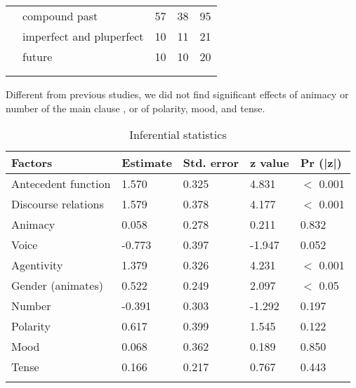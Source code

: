 \documentclass[output=paper,colorlinks,citecolor=brown]{langscibook}
\begin{document}
\begin{table}
{\begin{tabularx}{1.0\textwidth}{XXXXX}
  & compound past & 57 & 38 & 95  \\ %
  & imperfect and pluperfect & 10 & 11 & 21 \\ %
  & future & 10 & 10 & 20 \\  %
 \\      \lspbottomrule
\end{tabularx}
}
\end{table}


Different from previous studies, we did not find significant effects of animacy or number of the main clause , or of polarity, mood, and tense.

\begin{table}
\caption{Inferential statistics}
\label{tab:myname:results_fact:Istrate}
\begin{tabularx}{1.0\textwidth}{XXXXX}
 \lsptoprule
Factors & Estimate & Std. error & z value & Pr (|z|)\\
  \midrule
Antecedent function & 1.570 & 0.325 & 4.831 & $<$ 0.001\\ %
Discourse relations & 1.579 & 0.378 & 4.177 & $<$ 0.001 \\ %
Animacy & 0.058 & 0.278 & 0.211 & 0.832 \\ %
Voice & -0.773 & 0.397 & -1.947 & 0.052 \\ %
Agentivity & 1.379 & 0.326 & 4.231 & $<$ 0.001 \\ %
Gender (animates) & 0.522 & 0.249 & 2.097 & $<$ 0.05 \\ %
Number & -0.391 & 0.303 & -1.292 & 0.197 \\ %
Polarity & 0.617 & 0.399 & 1.545 & 0.122 \\ %
Mood & 0.068 & 0.362 & 0.189 & 0.850 \\ %
Tense & 0.166 & 0.217 & 0.767 & 0.443 
\\   \lspbottomrule
\end{tabularx}
\end{table}
\end{document}
